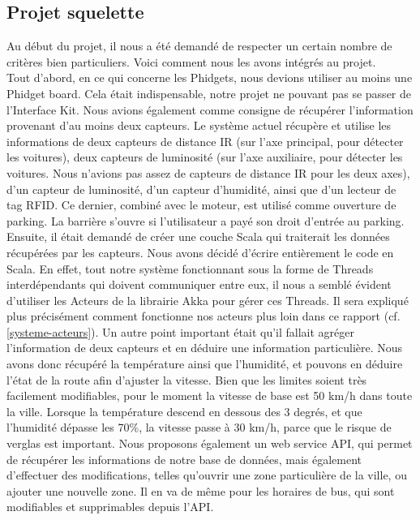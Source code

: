 \subsection{Projet squelette}
Au début du projet, il nous a été demandé de respecter un certain nombre de critères bien particuliers. Voici comment nous les avons intégrés au projet.\\

Tout d’abord, en ce qui concerne les Phidgets, nous devions utiliser au moins une Phidget board. Cela était indispensable, notre projet ne pouvant pas se passer de l’Interface Kit. Nous avions également comme consigne de récupérer l’information provenant d’au moins deux capteurs. Le système actuel récupère et utilise les informations de deux capteurs de distance IR (sur l’axe principal, pour détecter les voitures), deux capteurs de luminosité (sur l’axe auxiliaire, pour détecter les voitures. Nous n’avions pas assez de capteurs de distance IR pour les deux axes), d’un capteur de luminosité, d’un capteur d’humidité, ainsi que d’un lecteur de tag RFID. Ce dernier, combiné avec le moteur, est utilisé comme ouverture de parking. La barrière s’ouvre si l’utilisateur a payé son droit d’entrée au parking.\\

Ensuite, il était demandé de créer une couche Scala qui traiterait les données récupérées par les capteurs. Nous avons décidé d’écrire entièrement le code en Scala. En effet, tout notre système fonctionnant sous la forme de Threads interdépendants qui doivent communiquer entre eux, il nous a semblé évident d’utiliser les Acteurs de la librairie Akka pour gérer ces Threads. Il sera expliqué plus précisément comment fonctionne nos acteurs plus loin dans ce rapport (cf. \ref{systeme-acteurs}). Un autre point important était qu’il fallait agréger l’information de deux capteurs et en déduire une information particulière. Nous avons donc récupéré la température ainsi que l’humidité, et pouvons en déduire l’état de la route afin d’ajuster la vitesse. Bien que les limites soient très facilement modifiables, pour le moment la vitesse de base est 50 km/h dans toute la ville. Lorsque la température descend en dessous des 3 degrés, et que l’humidité dépasse les 70\%, la vitesse passe à 30 km/h, parce que le risque de verglas est important. Nous proposons également un web service API, qui permet de récupérer les informations de notre base de données, mais également d’effectuer des modifications, telles qu’ouvrir une zone particulière de la ville, ou ajouter une nouvelle zone. Il en va de même pour les horaires de bus, qui sont modifiables et supprimables depuis l’API.\\